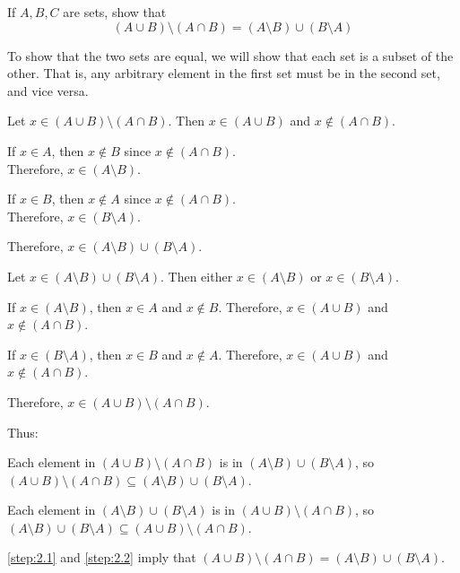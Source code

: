 \begin{problem}
  If $A, B, C$ are sets, show that
  \[ (A \cup B) \setminus (A \cap B) = (A \setminus B) \cup (B \setminus A) \]
\end{problem}

\begin{answer}
  To show that the two sets are equal, we will show that each set is a subset
  of the other. That is, any arbitrary element in the first set must be in
  the second set, and vice versa.

  \begin{enumroman}
    \item Let $x \in (A \cup B) \setminus (A \cap B)$. Then $x \in (A \cup B)$
      and $x \notin (A \cap B)$.
      \begin{enumalph}
        \item If $x \in A$, then $x \not \in B$ since $x \not \in (A \cap B)$. \\
          Therefore, $x \in (A \setminus B)$.
        \item If $x \in B$, then $x \not \in A$ since $x \not \in (A \cap B)$. \\
          Therefore, $x \in (B \setminus A)$.
      \end{enumalph}
      Therefore, $x \in (A \setminus B) \cup (B \setminus A)$.

    \item Let $x \in (A \setminus B) \cup (B \setminus A)$. Then either $x \in (A \setminus B)$
      or $x \in (B \setminus A)$.
      \begin{enumalph}
        \item If $x \in (A \setminus B)$, then $x \in A$ and $x \notin B$.
          Therefore, $x \in (A \cup B)$ and $x \notin (A \cap B)$.
        \item If $x \in (B \setminus A)$, then $x \in B$ and $x \notin A$.
          Therefore, $x \in (A \cup B)$ and $x \notin (A \cap B)$.
      \end{enumalph}
      Therefore, $x \in (A \cup B) \setminus (A \cap B)$.
  \end{enumroman}

  \step
  Thus:
  \begin{enumarabic}
    \item Each element in $(A \cup B) \setminus (A \cap B)$ is in $(A \setminus B) \cup (B \setminus A)$,
      so $(A \cup B) \setminus (A \cap B) \subseteq (A \setminus B) \cup (B \setminus A)$.~\label{step:2.1}
    \item Each element in $(A \setminus B) \cup (B \setminus A)$ is in $(A \cup B) \setminus (A \cap B)$,
      so $(A \setminus B) \cup (B \setminus A) \subseteq (A \cup B) \setminus (A \cap B)$.~\label{step:2.2}
    \item \ref{step:2.1} and \ref{step:2.2} imply that $(A \cup B) \setminus (A \cap B) = (A \setminus B) \cup (B \setminus A)$.
  \end{enumarabic}
\end{answer}
